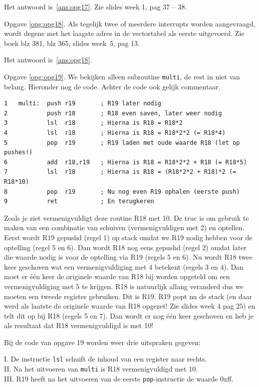 \documentclass[a4paper,12pt,fleqn,dutch,mimicwordtwentyten]{tisdexam}
\begin{document}
\begin{questions}
Het antwoord is~\ref{ans:opg17}. Zie slides week 1, pag 37 -- 38.

\vspace{1em}
Opgave \ref{opg:opg18}.\label{sol:opg18}
Als tegelijk twee of meerdere interrupts worden aangevraagd, wordt degene met
het laagste adres in de vectortabel als eerste uitgevoerd. Zie boek blz 381,
blz 365, slides week~5, pag 13. 

Het antwoord is~\ref{ans:opg18}.

\vspace{1em}
Opgave \ref{opg:opg19}.\label{sol:opg19}
We bekijken alleen subroutine \texttt{multi}, de rest in niet
van belang. Hieronder nog de code. Achter de code ook gelijk commentaar.
\begin{lstlisting}
1   multi:  push r19       ; R19 later nodig
2           push r18       ; R18 even saven, later weer nodig
3           lsl  r18       ; Hierna is R18 = R18*2
4           lsl	 r18       ; Hierna is R18 = R18*2*2 (= R18*4)
5           pop	 r19       ; R19 laden met oude waarde R18 (let op pushes!)
6           add	 r18,r19   ; Hierna is R18 = R18*2*2 + R18 (= R18*5)
7           lsl	 r18       ; Hierna is R18 = (R18*2*2 + R18)*2 (= R18*10)
8           pop	 r19       ; Nu nog even R19 ophalen (eerste push)
9           ret            ; En terugkeren
\end{lstlisting}

Zoals je ziet vermenigvuldigt deze routine R18 met 10. De truc is om gebruik
te maken van een combinatie van schuiven (vermenigvuldigen met 2) en optellen.
Eerst wordt R19 gepushd (regel 1) op stack omdat we R19 nodig hebben voor de
optelling (regel 5 en 6). Dan wordt R18 nog eens gepushd (regel 2) omdat later
die waarde nodig is voor de optelling via R19 (regels 5 en 6). Nu wordt R18
twee keer geschoven wat een vermenigvuldiging met 4 betekent (regels 3 en 4).
Dan moet er \'{e}\'{e}n keer de originele waarde van R18 bij worden opgeteld
om een vermenigvuldiging met 5 te krijgen. R18 is natuurlijk allang veranderd
dus we moeten een tweede register gebruiken. Dit is R19. R19 popt nu de stack
(en daar werd als laatste de originele waarde van R18 opgezet! Zie slides week
4 pag 25) en telt dit op bij R18 (regels 5 en 7). Dan wordt er nog \'{e}\'{e}n
keer geschoven en heb je als resultaat dat R18 vermenigvuldigd is met 10!

Bij de code van opgave 19 worden weer drie uitspraken gegeven:

I. De instructie \texttt{lsl} schuift de inhoud van een register naar rechts.\\ 
II. Na het uitvoeren van \texttt{multi} is R18 vermenigvuldigd met 10.\\
III. R19 heeft na het uitvoeren van de eerste \texttt{pop}-instructie de
waarde 0x{f}{f}.


\end{questions}
\end{document}
